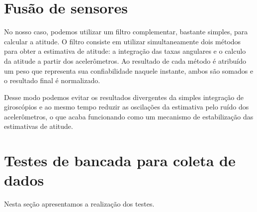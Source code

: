\section{Fusão de sensores}

No nosso caso, podemos utilizar um filtro complementar, bastante simples, para calcular a atitude. O filtro consiste em utilizar simultaneamente dois métodos para obter a estimativa de atitude: a integração das taxas angulares e o calculo da atitude a partir dos acelerômetros. Ao resultado de cada método é atribuído um peso que representa sua confiabilidade naquele instante, ambos são somados e o resultado final é normalizado. 

Desse modo podemos evitar os resultados divergentes da simples integração de giroscópios e ao mesmo tempo reduzir as oscilações da estimativa pelo ruído dos acelerômetros, o que acaba funcionando como um mecanismo de estabilização das estimativas de atitude.

\section{Testes de bancada para coleta de dados}

Nesta seção apresentamos a realização dos testes.


